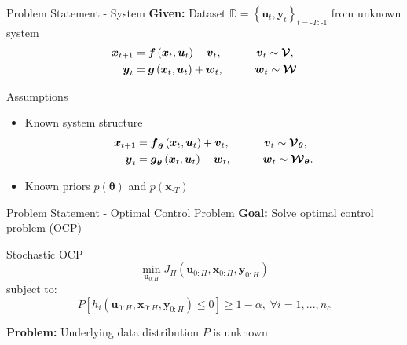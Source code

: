 \documentclass[student, noshadow, itr, english, aspectratio=169]{ITR_LSR_slides}
\begin{document}
\begin{frame}{Problem Statement - System}	
	\textbf{Given:} Dataset $\mathbb{D} = \left\{\boldsymbol{u}_{t}, \boldsymbol{y}_{t}\right\}_{t = \text{-}T:\text{-}1}$ from unknown system
	\begin{equation*}
	\begin{split}
	\boldsymbol{x}_{t+1} &= \boldsymbol{f} \left( \boldsymbol{x}_{t}, \boldsymbol{u}_t \right) + \boldsymbol{v}_{t}, \makebox[1cm]{\hfill} \; \boldsymbol{v}_{t} \sim \boldsymbol{\mathcal{V}},\\
	\boldsymbol{y}_{t} &= \boldsymbol{g} \left( \boldsymbol{x}_{t}, \boldsymbol{u}_t \right) + \boldsymbol{w}_{t}, \makebox[1cm]{\hfill} \boldsymbol{w}_{t} \sim \boldsymbol{\mathcal{W}}
	\end{split}
	\end{equation*}

	\begin{block}{Assumptions}
	\begin{itemize}
		\item 
		Known system structure
	\begin{equation*}
	\begin{split}
	\boldsymbol{x}_{t+1} &= \boldsymbol{f}_{\boldsymbol{\theta}} \left( \boldsymbol{x}_{t}, \boldsymbol{u}_t \right) + \boldsymbol{v}_{t}, \makebox[1cm]{\hfill} \; \boldsymbol{v}_{t} \sim \boldsymbol{\mathcal{V}}_{\boldsymbol{\theta}},\\
	\boldsymbol{y}_{t} &= \boldsymbol{g}_{\boldsymbol{\theta}} \left( \boldsymbol{x}_{t}, \boldsymbol{u}_t \right) + \boldsymbol{w}_{t}, \makebox[1cm]{\hfill} \boldsymbol{w}_{t} \sim \boldsymbol{\mathcal{W}}_{\boldsymbol{\theta}}.
	\end{split}
	\end{equation*}
	\item 
	Known priors $p(\boldsymbol{\theta})$ and $p(\boldsymbol{x}_{\text{-}T})$
	\end{itemize}
	\end{block}	


\end{frame}

\begin{frame}{Problem Statement - Optimal Control Problem}	
	\textbf{Goal:} Solve optimal control problem (OCP)\\
	\begin{block}{Stochastic OCP}
		\begin{equation*}
		\min\limits_{\boldsymbol{u}_{0:H}} J_H(\boldsymbol{u}_{0:H},  \boldsymbol{x}_{0:H},  \boldsymbol{y}_{0:H}) 
		\end{equation*}
		subject to: 
		\begin{equation*}
		P \left[ h_i(\boldsymbol{u}_{0:H},  \boldsymbol{x}_{0:H},  \boldsymbol{y}_{0:H}) \leq 0 \right] \geq 1 - \alpha, \; \forall i = 1,...,n_c
		\end{equation*}
	\end{block}	
	\textbf{Problem:} Underlying data distribution $P$ is unknown
\end{frame}
\end{document}
